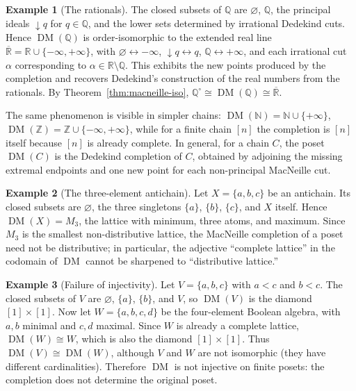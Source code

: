 \documentclass{amsart}
\theoremstyle{plain}
\theoremstyle{definition}
\newtheorem{example}{Example}[section]
\theoremstyle{remark}
\DeclareMathOperator{\DM}{DM}
\begin{document}
\begin{example}[The rationals]\label{ex:Q}
The closed subsets of $\mathbb{Q}$ are $\varnothing$, $\mathbb{Q}$, the principal ideals $\downarrow q$ for $q\in\mathbb{Q}$, and the lower sets determined by irrational Dedekind cuts. Hence $\DM(\mathbb{Q})$ is order-isomorphic to the extended real line $\overline{\mathbb{R}}=\mathbb{R}\cup\{-\infty,+\infty\}$, with $\varnothing\leftrightarrow-\infty$, $\downarrow q\leftrightarrow q$, $\mathbb{Q}\leftrightarrow+\infty$, and each irrational cut $\alpha$ corresponding to $\alpha\in\mathbb{R}\setminus\mathbb{Q}$. This exhibits the new points produced by the completion and recovers Dedekind's construction of the real numbers from the rationals. By Theorem~\ref{thm:macneille-iso}, $\mathbb{Q}^\circ\cong\DM(\mathbb{Q})\cong\overline{\mathbb{R}}$.
\end{example}

The same phenomenon is visible in simpler chains: $\DM(\mathbb{N})=\mathbb{N}\cup\{+\infty\}$, $\DM(\mathbb{Z})=\mathbb{Z}\cup\{-\infty,+\infty\}$, while for a finite chain $[n]$ the completion is $[n]$ itself because $[n]$ is already complete. In general, for a chain $C$, the poset $\DM(C)$ is the Dedekind completion of $C$, obtained by adjoining the missing extremal endpoints and one new point for each non-principal MacNeille cut.

\begin{example}[The three-element antichain]\label{ex:antichain3}
Let $X=\{a,b,c\}$ be an antichain. Its closed subsets are $\varnothing$, the three singletons $\{a\}$, $\{b\}$, $\{c\}$, and $X$ itself. Hence $\DM(X)=M_3$, the lattice with minimum, three atoms, and maximum. Since $M_3$ is the smallest non-distributive lattice, the MacNeille completion of a poset need not be distributive; in particular, the adjective ``complete lattice'' in the codomain of $\DM$ cannot be sharpened to ``distributive lattice.''
\end{example}

\begin{example}[Failure of injectivity]\label{ex:V-wedge}
Let \(V=\{a,b,c\}\) with \(a<c\) and \(b<c\). The closed subsets of \(V\) are \(\varnothing\), \(\{a\}\), \(\{b\}\), and \(V\), so \(\DM(V)\) is the diamond \([1]\times[1]\). Now let \(W=\{a,b,c,d\}\) be the four-element Boolean algebra, with \(a,b\) minimal and \(c,d\) maximal. Since \(W\) is already a complete lattice, \(\DM(W)\cong W\), which is also the diamond \([1]\times[1]\). Thus \(\DM(V)\cong\DM(W)\), although \(V\) and \(W\) are not isomorphic (they have different cardinalities). Therefore \(\DM\) is not injective on finite posets: the completion does not determine the original poset.
\end{example}
\end{document}
